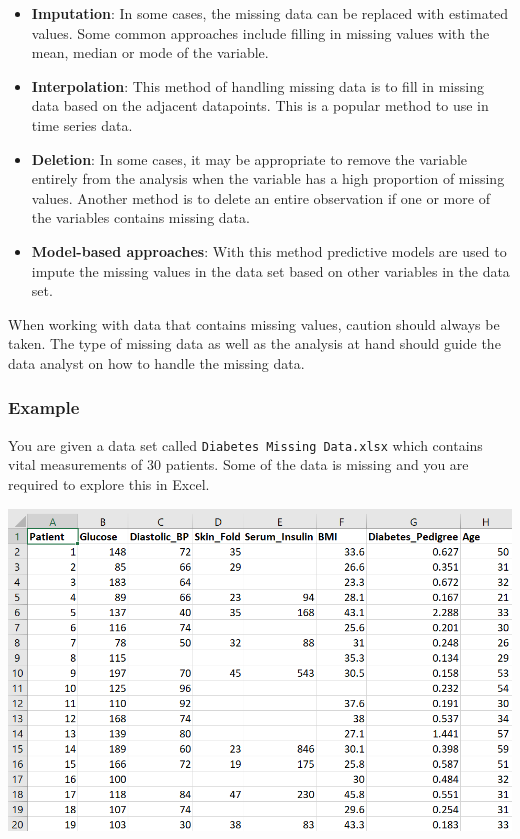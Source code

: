 \documentclass[
]{book}
\begin{document}
\begin{itemize}
\item
  \textbf{Imputation}: In some cases, the missing data can be replaced with estimated values. Some common approaches include filling in missing values with the mean, median or mode of the variable.
\item
  \textbf{Interpolation}: This method of handling missing data is to fill in missing data based on the adjacent datapoints. This is a popular method to use in time series data.
\item
  \textbf{Deletion}: In some cases, it may be appropriate to remove the variable entirely from the analysis when the variable has a high proportion of missing values. Another method is to delete an entire observation if one or more of the variables contains missing data.
\item
  \textbf{Model-based approaches}: With this method predictive models are used to impute the missing values in the data set based on other variables in the data set.
\end{itemize}

When working with data that contains missing values, caution should always be taken. The type of missing data as well as the analysis at hand should guide the data analyst on how to handle the missing data.

\subsubsection{Example}\label{example-1}

You are given a data set called \texttt{Diabetes\ Missing\ Data.xlsx} which contains vital measurements of 30 patients. Some of the data is missing and you are required to explore this in Excel.

\begin{center}\includegraphics[width=0.8\linewidth]{Figures/missing} \end{center}
\end{document}
